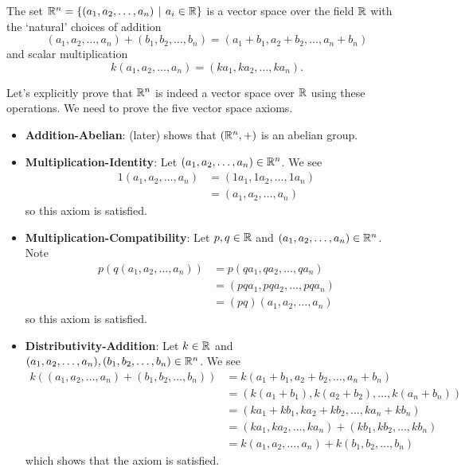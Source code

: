 \begin{example}\label{example-R^n-is-vector-space}
    The set $\R^n = \{(a_1, a_2, \dots, a_n) \vert a_i \in \R\}$ is a vector space over the field $\mathbb{R}$ with the `natural' choices of addition
    \[
        (a_1, a_2, \dots, a_n) + (b_1, b_2, \dots, b_n) = (a_1 + b_1, a_2 + b_2, \dots, a_n + b_n)
    \]
    and scalar multiplication
    \[
        k(a_1, a_2, \dots, a_n) = (ka_1, ka_2, \dots, ka_n).
    \]

    Let's explicitly prove that $\mathbb{R}^n$ is indeed a vector space over $\mathbb{R}$ using these operations. We need to prove the five vector space axioms.
    \begin{itemize}
        \item \textbf{Addition-Abelian}:  (later) shows that $(\mathbb{R}^n, +)$ is an abelian group.
        
        \item \textbf{Multiplication-Identity}: Let $(a_1, a_2, \dots, a_n) \in \mathbb{R}^n$. We see
        \begin{align*}
            1(a_1, a_2, \dots, a_n) &= (1a_1, 1a_2, \dots, 1a_n)\\
            &= (a_1, a_2, \dots, a_n)
        \end{align*}
        so this axiom is satisfied.

        \item \textbf{Multiplication-Compatibility}: Let $p, q \in \mathbb{R}$ and $(a_1, a_2, \dots, a_n) \in \mathbb{R}^n$. Note
        \begin{align*}
            p\left(q(a_1, a_2, \dots, a_n)\right) &= p(qa_1, qa_2, \dots, qa_n)\\
            &= (pqa_1, pqa_2, \dots, pqa_n)\\
            &= (pq)(a_1, a_2, \dots, a_n)
        \end{align*}
        so this axiom is satisfied.
        
        \item \textbf{Distributivity-Addition}: Let $k \in \mathbb{R}$ and $(a_1, a_2, \dots, a_n), (b_1, b_2, \dots, b_n) \in \mathbb{R}^n$. We see
        \begin{align*}
            k\left((a_1, a_2, \dots, a_n) + (b_1, b_2, \dots, b_n)\right) &= k(a_1 + b_1, a_2 + b_2, \dots, a_n + b_n)\\
            &= (k(a_1 + b_1), k(a_2 + b_2), \dots, k(a_n + b_n))\\
            &= (ka_1 + kb_1, ka_2 + kb_2, \dots, ka_n + kb_n)\\
            &= (ka_1, ka_2, \dots, ka_n) + (kb_1, kb_2, \dots, kb_n)\\
            &= k(a_1, a_2, \dots, a_n) + k(b_1, b_2, \dots, b_n)
        \end{align*}
        which shows that the axiom is satisfied.
        

\end{itemize}
\end{example}
